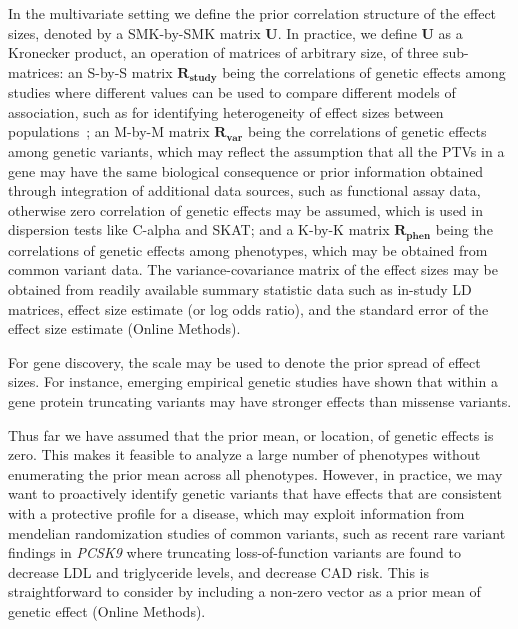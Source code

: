 \documentclass{nature}
\begin{document}
In the multivariate setting we define the prior correlation structure of the effect sizes, denoted by a SMK-by-SMK matrix $\mathbf{U}$. In practice, we define $\mathbf{U}$ as a Kronecker product, an operation of matrices of arbitrary size, of three sub-matrices: an S-by-S matrix $\mathbf{R_{\textrm{study}}}$ being the correlations of genetic effects among studies where different values can be used to compare different models of association, such as for identifying heterogeneity of effect sizes between populations~\cite{band2013imputation}; an M-by-M matrix $\mathbf{R_{\textrm{var}}}$ being the correlations of genetic effects among genetic variants, which may reflect the assumption that all the PTVs in a gene may have the same biological consequence\cite{macarthur,rivas2013assessing,rivas2015effect} or prior information obtained through integration of additional data sources, such as functional assay data\cite{majithia2014rare,findlay2014saturation}, otherwise zero correlation of genetic effects may be assumed, which is used in dispersion tests like C-alpha\cite{calpha,clarke2013flexible} and SKAT\cite{skat}; and a K-by-K matrix $\mathbf{R_{\textrm{phen}}}$ being the correlations of genetic effects among phenotypes, which may be obtained from common variant data\cite{cotsapas2011pervasive,solovieff2013pleiotropy,gencorr2015}. The variance-covariance matrix of the effect sizes may be obtained from readily available summary statistic data such as in-study LD matrices, effect size estimate (or log odds ratio), and the standard error of the effect size estimate (Online Methods).

For gene discovery, the scale may be used to denote the prior spread of effect sizes. For instance, emerging empirical genetic studies have shown that within a gene protein truncating variants may have stronger effects than missense variants\cite{do2015exome}.

Thus far we have assumed that the prior mean, or location, of genetic effects is zero. This makes it feasible to analyze a large number of phenotypes without enumerating the prior mean across all phenotypes. However, in practice, we may want to proactively identify genetic variants that have effects that are consistent with a protective profile for a disease, which may exploit information from mendelian randomization studies of common variants, such as recent rare variant findings in {\it PCSK9} where truncating loss-of-function variants are found to decrease LDL and triglyceride levels, and decrease CAD risk\cite{cohen2005low,pcsk9,do2013common,cohorts2014loss}. This is straightforward to consider by including a non-zero vector as a prior mean of genetic effect (Online Methods).
\end{document}
